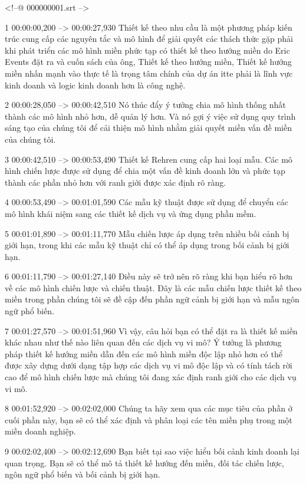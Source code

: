 <!--@ 000000001.srt -->

1
00:00:00,200 --> 00:00:27,930
Thiết kế theo nhu cầu là một phương pháp kiến ​​trúc cung cấp các nguyên tắc và mô hình để giải quyết các thách thức gặp phải khi phát triển các mô hình miền phức tạp có thiết kế theo hướng miền do Eric Events đặt ra và cuốn sách của ông, Thiết kế theo hướng miền, Thiết kế hướng miền nhấn mạnh vào thực tế là  trọng tâm chính của dự án itte phải là lĩnh vực kinh doanh và logic kinh doanh hơn là công nghệ.

2
00:00:28,050 --> 00:00:42,510
Nó thúc đẩy ý tưởng chia mô hình thống nhất thành các mô hình nhỏ hơn, dễ quản lý hơn.  Và nó gợi ý việc sử dụng quy trình sáng tạo của chúng tôi để cải thiện mô hình nhằm giải quyết miền vấn đề miền của chúng tôi.

3
00:00:42,510 --> 00:00:53,490
Thiết kế Rehren cung cấp hai loại mẫu.  Các mô hình chiến lược được sử dụng để chia một vấn đề kinh doanh lớn và phức tạp thành các phần nhỏ hơn với ranh giới được xác định rõ ràng.

4
00:00:53,490 --> 00:01:01,590
Các mẫu kỹ thuật được sử dụng để chuyển các mô hình khái niệm sang các thiết kế dịch vụ và ứng dụng phần mềm.

5
00:01:01,890 --> 00:01:11,770
Mẫu chiến lược áp dụng trên nhiều bối cảnh bị giới hạn, trong khi các mẫu kỹ thuật chỉ có thể áp dụng trong bối cảnh bị giới hạn.

6
00:01:11,790 --> 00:01:27,140
Điều này sẽ trở nên rõ ràng khi bạn hiểu rõ hơn về các mô hình chiến lược và chiến thuật.  Đây là các mẫu chiến lược thiết kế theo miền trong phần chúng tôi sẽ đề cập đến phần ngữ cảnh bị giới hạn và mẫu ngôn ngữ phổ biến.

7
00:01:27,570 --> 00:01:51,960
Vì vậy, câu hỏi bạn có thể đặt ra là thiết kế miền khác nhau như thế nào liên quan đến các dịch vụ vi mô?  Ý tưởng là phương pháp thiết kế hướng miền dẫn đến các mô hình miền độc lập nhỏ hơn có thể được xây dựng dưới dạng tập hợp các dịch vụ vi mô độc lập và có tính tách rời cao để mô hình chiến lược mà chúng tôi đang xác định ranh giới cho các dịch vụ vi mô.

8
00:01:52,920 --> 00:02:02,000
Chúng ta hãy xem qua các mục tiêu của phần ở cuối phần này, bạn sẽ có thể xác định và phân loại các tên miền phụ trong một miền doanh nghiệp.

9
00:02:02,400 --> 00:02:12,690
Bạn biết tại sao việc hiểu bối cảnh kinh doanh lại quan trọng.  Bạn sẽ có thể mô tả thiết kế hướng đến miền, đối tác chiến lược, ngôn ngữ phổ biến và bối cảnh bị giới hạn.

